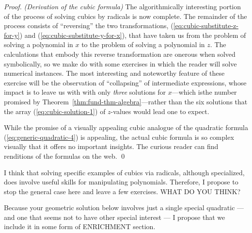 \begin{proof} {\it (Derivation of the cubic formula)}
The algorithmically interesting portion of the process of solving
cubics by radicals is now complete.  The remainder of the process
consists of ``reversing'' the two transformations,
(\ref{eq:cubic-substitute-z-for-y}) and
(\ref{eq:cubic-substitute-y-for-x}), that have taken us from the
problem of solving a polynomial in $x$ to the problem of solving a
polynomial in $z$.  The calculations that embody this reverse
transformation are onerous when solved symbolically, so we make do
with some exercises in which the reader will solve numerical
instances.  The most interesting and noteworthy feature of these
exercise will be the observation of ``collapsing'' of intermediate
expressions, whose impact is to leave us with with only {\em three}
solutions for $x$---which isthe number promised by
Theorem~\ref{thm:fund-thm-algebra}---rather than the six solutions
that the array (\ref{eq:cubic-solution-1}) of $z$-values would lead
one to expect.

While the promise of a visually appealing cubic analogue of the
quadratic formula (\ref{eq:generic-quadratic-4}) is appealing, the
actual cubic formula is so complex visually that it offers no
important insights.  The curious reader can find renditions of the
formulas on the web.  \qed
\end{proof}

{\Arny
I think that solving specific examples of cubics via radicals, although specialized, does
involve useful skills for manipulating polynomials.  Therefore, I
propose to stop the general case here and leave a few exercises.  WHAT DO YOU THINK?}



{\Arny Because your geometric solution below involves just a single
  special quadratic --- and one that seems not to have other special
  interest --- I propose that we include it in some form of ENRICHMENT
  section.  }

